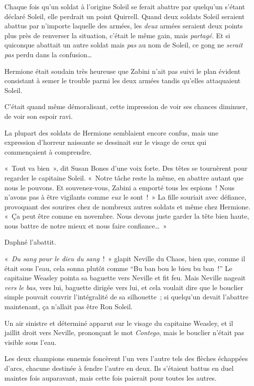 Chaque fois qu'un soldat à l'origine Soleil se ferait abattre par quelqu'un s'étant déclaré Soleil, elle perdrait un point Quirrell.
Quand deux soldats Soleil seraient abattus par n'importe laquelle des armées, les \emph{deux} armées seraient deux points plus près de renverser la situation, c'était le même gain, mais \emph{partagé}.
Et si quiconque abattait un autre soldat mais \emph{pas} au nom de Soleil, ce gong ne \emph{serait pas} perdu dans la confusion…

Hermione était soudain très heureuse que Zabini n'ait pas suivi le plan évident consistant à semer le trouble parmi les deux armées tandis qu'elles attaquaient Soleil.

C'était quand même démoralisant, cette impression de voir ses chances diminuer, de voir son espoir ravi.

La plupart des soldats de Hermione semblaient encore confus, mais une expression d'horreur naissante se dessinait sur le visage de ceux qui commençaient à comprendre.

«~Tout va bien~», dit Susan Bones d'une voix forte.
Des têtes se tournèrent pour regarder le capitaine Soleil.
«~Notre tâche reste la même, en abattre autant que nous le pouvons.
Et souvenez-vous, Zabini a emporté tous les espions~!
Nous n'avons pas à être vigilants comme \emph{eux} le sont~!~»
La fille souriait avec défiance, provoquant des sourires chez de nombreux autres soldats et même chez Hermione.
«~Ça peut être comme en novembre.
Nous devons juste garder la tête bien haute, nous battre de notre mieux et nous faire confiance…~»

Daphné l'abattit.

\later

«~\emph{Du sang pour le dieu du sang}~!~»
glapit Neville du Chaos, bien que, comme il était sous l'eau, cela sonna plutôt comme “Bu ban bou le bieu bu ban~!”
Le capitaine Weasley pointa sa baguette vers Neville et fit feu.
Mais Neville nageait \emph{vers le bas}, vers lui, baguette dirigée vers lui, et cela voulait dire que le bouclier simple pouvait couvrir l'intégralité de sa silhouette~; si quelqu'un devait l'abattre maintenant, ça n'allait pas être Ron Soleil.

Un air sinistre et déterminé apparut sur le visage du capitaine Weasley, et il jaillit droit vers Neville, prononçant le mot \emph{Contego}, mais le bouclier n'était pas visible sous l'eau.

Les deux champions ennemis foncèrent l'un vers l'autre tels des flèches échappées d'arcs, chacune destinée à fendre l'autre en deux.
Ils s'étaient battus en duel maintes fois auparavant, mais cette fois paierait pour toutes les autres.

